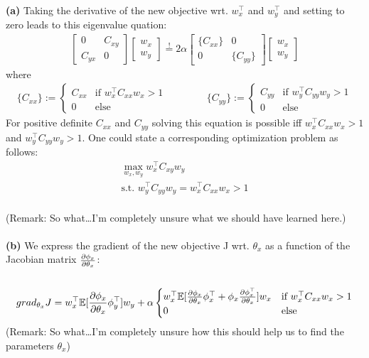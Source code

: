 \documentclass[a4paper]{article}
\newcommand{\eqq}{  \overset{\text{!}}{=} }
\newcommand{\wx}{{w_{x}}}
\newcommand{\wy}{{w_{y}}}
\newcommand{\wxt}{w_{x}^\top}
\newcommand{\wyt}{w_{y}^\top}
\newcommand{\Cxx}{C_{xx}}
\newcommand{\Cxy}{C_{xy}}
\newcommand{\Cyx}{C_{yx}}
\newcommand{\Cyy}{C_{yy}}
\newcommand{\1}{\mathds{1}}
\begin{document}
\newpage
{}
\textbf{(a)} Taking the derivative of the new objective wrt. $\wxt$ and $\wyt$ and setting to 
zero leads to this eigenvalue quation: 
\begin{align*}
	\begin{bmatrix}
	0 & \Cxy \\
	\Cyx & 0 
	\end{bmatrix}
	\begin{bmatrix}
	 \wx  \\
	 \wy
	\end{bmatrix}
\eqq	 
	2\alpha		
	\begin{bmatrix}
	\{\Cxx\} & 0 \\
	0 & \{\Cyy\}   
	\end{bmatrix}
	\begin{bmatrix}
	 \wx  \\
	 \wy
	\end{bmatrix}	
\end{align*}
where
\begin{align*} 
	\{\Cxx\} := \begin{cases} \Cxx &\text{if } \wxt\Cxx\wx > 1\\ 0 &\text{else} \end{cases}
	\quad\quad\quad\quad
	\{\Cyy\} := \begin{cases} \Cyy &\text{if } \wyt\Cyy\wy > 1\\ 0 &\text{else} \end{cases}
\end{align*}
For positive definite $\Cxx$ and $\Cyy$ solving this equation is possible
iff $\wxt\Cxx\wx > 1$ and $\wyt\Cyy\wy > 1$. 
One could state a corresponding optimization problem as follows: 
\begin{gather*}
	\max_{\wx,\wy} \wxt\Cxy\wy \\ 
	\text{s.t. } \wyt\Cyy\wy = \wxt C_{xx} \wx > 1 
\end{gather*}
\\
(Remark: So what\ldots I'm completely unsure what we should have learned here.)
\\
\\
\textbf{(b)}
We express the gradient of the new objective J wrt. $\theta_x$
as a function of the Jacobian matrix ${\partial\phi_x\over\partial\theta_x}$:\\
\\
\begin{gather*}
grad_{\theta_x}J 
= 
\wxt\mathbb{E}[{ {\partial\phi_x\over\partial\theta_x} \phi^\top_y }]\wy
+ \alpha 
	\begin{cases} \wxt
	\mathbb{E}[{ {\partial\phi_x\over\partial\theta_x} \phi^\top_x} + { \phi_x {\partial\phi_x^\top\over\partial\theta_x} } ]
	\wx &\text{if } \wxt\Cxx\wx > 1\\ 0 &\text{else} \end{cases}
\end{gather*}
(Remark: So what\ldots I'm completely unsure how this should help us to find the parameters $\theta_x$)
\end{document}
